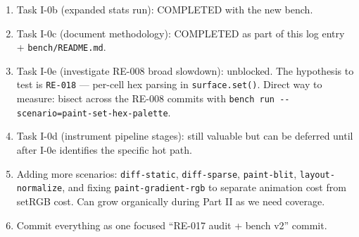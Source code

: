 \begin{enumerate}
\def\labelenumi{\arabic{enumi}.}
\tightlist
\item
  Task I-0b (expanded stats run): COMPLETED with the new bench.
\item
  Task I-0c (document methodology): COMPLETED as part of this log entry + \texttt{b\allowbreak{}e\allowbreak{}n\allowbreak{}c\allowbreak{}h\allowbreak{}/\allowbreak{}R\allowbreak{}E\allowbreak{}A\allowbreak{}D\allowbreak{}M\allowbreak{}E\allowbreak{}.\allowbreak{}m\allowbreak{}d}.
\item
  Task I-0e (investigate RE-008 broad slowdown): unblocked. The hypothesis to test is \texttt{R\allowbreak{}E\allowbreak{}-\allowbreak{}0\allowbreak{}1\allowbreak{}8} --- per-cell hex parsing in \texttt{s\allowbreak{}u\allowbreak{}r\allowbreak{}f\allowbreak{}a\allowbreak{}c\allowbreak{}e\allowbreak{}.\allowbreak{}s\allowbreak{}e\allowbreak{}t\allowbreak{}(\allowbreak{})}. Direct way to measure: bisect across the RE-008 commits with \texttt{b\allowbreak{}e\allowbreak{}n\allowbreak{}c\allowbreak{}h\allowbreak{} \allowbreak{}r\allowbreak{}u\allowbreak{}n\allowbreak{} \allowbreak{}-\allowbreak{}-\allowbreak{}s\allowbreak{}c\allowbreak{}e\allowbreak{}n\allowbreak{}a\allowbreak{}r\allowbreak{}i\allowbreak{}o\allowbreak{}=\allowbreak{}p\allowbreak{}a\allowbreak{}i\allowbreak{}n\allowbreak{}t\allowbreak{}-\allowbreak{}s\allowbreak{}e\allowbreak{}t\allowbreak{}-\allowbreak{}h\allowbreak{}e\allowbreak{}x\allowbreak{}-\allowbreak{}p\allowbreak{}a\allowbreak{}l\allowbreak{}e\allowbreak{}t\allowbreak{}t\allowbreak{}e}.
\item
  Task I-0d (instrument pipeline stages): still valuable but can be deferred until after I-0e identifies the specific hot path.
\item
  Adding more scenarios: \texttt{d\allowbreak{}i\allowbreak{}f\allowbreak{}f\allowbreak{}-\allowbreak{}s\allowbreak{}t\allowbreak{}a\allowbreak{}t\allowbreak{}i\allowbreak{}c}, \texttt{d\allowbreak{}i\allowbreak{}f\allowbreak{}f\allowbreak{}-\allowbreak{}s\allowbreak{}p\allowbreak{}a\allowbreak{}r\allowbreak{}s\allowbreak{}e}, \texttt{p\allowbreak{}a\allowbreak{}i\allowbreak{}n\allowbreak{}t\allowbreak{}-\allowbreak{}b\allowbreak{}l\allowbreak{}i\allowbreak{}t}, \texttt{l\allowbreak{}a\allowbreak{}y\allowbreak{}o\allowbreak{}u\allowbreak{}t\allowbreak{}-\allowbreak{}n\allowbreak{}o\allowbreak{}r\allowbreak{}m\allowbreak{}a\allowbreak{}l\allowbreak{}i\allowbreak{}z\allowbreak{}e}, and fixing \texttt{p\allowbreak{}a\allowbreak{}i\allowbreak{}n\allowbreak{}t\allowbreak{}-\allowbreak{}g\allowbreak{}r\allowbreak{}a\allowbreak{}d\allowbreak{}i\allowbreak{}e\allowbreak{}n\allowbreak{}t\allowbreak{}-\allowbreak{}r\allowbreak{}g\allowbreak{}b} to separate animation cost from setRGB cost. Can grow organically during Part II as we need coverage.
\item
  Commit everything as one focused ``RE-017 audit + bench v2'' commit.
\end{enumerate}

